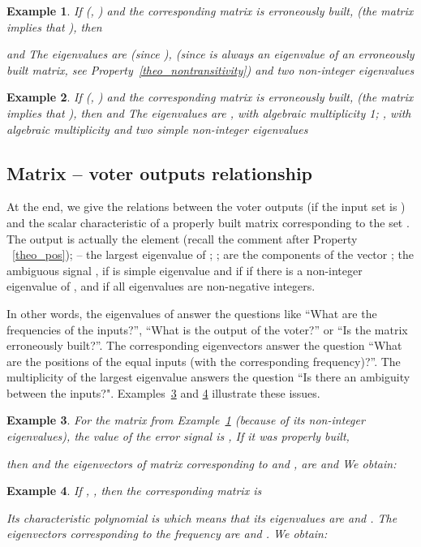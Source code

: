 \documentclass[technote, a4paper, onecolumn]{IEEEtran}  \newcommand{\avtor}{Aleksandar Simevski}
\newtheorem{ex}{Example}
\begin{document}
\medskip
\begin{ex}\label{pr5}
If  (, ) and the corresponding matrix  is erroneously built,  (the matrix implies that ), then

and 
The eigenvalues are  (since ),   (since  is always an eigenvalue of an erroneously built matrix, see Property~\ref{theo_nontransitivity}) and two non-integer eigenvalues 
\end{ex}

\medskip
\begin{ex}
If  (, ) and the corresponding matrix  is erroneously built,
 (the matrix implies that ), then
 and 
The eigenvalues are , with algebraic multiplicity 1; , with algebraic multiplicity  and two simple non-integer eigenvalues 
\end{ex}


\subsection{Matrix -- voter outputs relationship}\label{relations}
\medskip
At the end, we give the relations between the voter outputs (if the input set is ) and the scalar characteristic of a properly built matrix  corresponding to the set . The output  is actually the element  (recall the comment after Property ~\ref{theo_pos});  -- the largest eigenvalue of ; ;  are the components of the vector ; the ambiguous signal , if  is simple eigenvalue and  if   if there is a non-integer eigenvalue of , and  if all eigenvalues are non-negative integers.

In other words, the eigenvalues of  answer the questions like ``What are the frequencies of the inputs?'', ``What is the output of the voter?'' or ``Is the matrix erroneously built?''.  The corresponding eigenvectors answer the question ``What are the positions of the equal inputs (with the corresponding frequency)?''. The multiplicity of the largest eigenvalue answers the question ``Is there an ambiguity between the inputs?". Examples~\ref{ex7} and \ref{ex8} illustrate these issues.

\medskip
\begin{ex} \label{ex7} For the  matrix from Example~\ref{pr5} (because of its non-integer eigenvalues), the value of the error signal is ,  If it was properly built,

then 
and the eigenvectors of  matrix corresponding to  and , are  and 
We obtain: 
\end{ex}

\medskip
\begin{ex} \label{ex8} If , , then the corresponding matrix  is
 
Its characteristic polynomial is
 which means that its eigenvalues are 
and . The eigenvectors corresponding to the
frequency  are  and .
We obtain: 
\end{ex}
\end{document}
